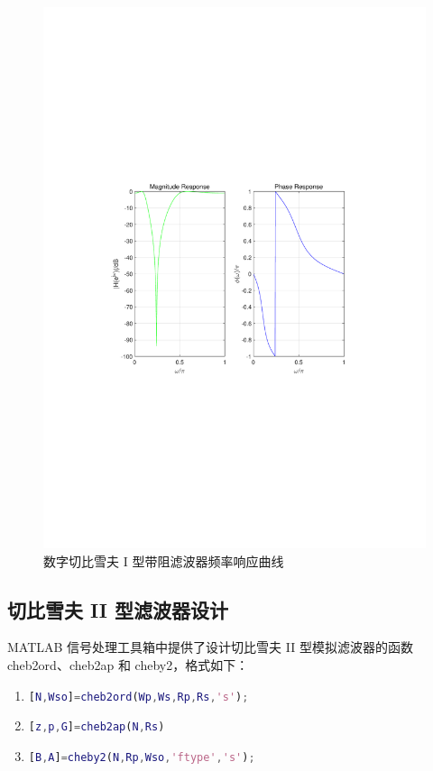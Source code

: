 \documentclass[12pt,AutoFakeBold]{article}
\begin{document}
\begin{figure}[hbtp]
	\centering
	\includegraphics[width=14cm]{figure/BSC1F.pdf}
	\caption{数字切比雪夫 I 型带阻滤波器频率响应曲线} \label{fig:BSC1F}
\end{figure}

\subsection{切比雪夫 II 型滤波器设计}

MATLAB 信号处理工具箱中提供了设计切比雪夫 II 型模拟滤波器的函数 cheb2ord、cheb2ap 和 cheby2，格式如下：

\begin{enumerate}[(1)]
\item \lstinline[language=Matlab]|[N,Wso]=cheb2ord(Wp,Ws,Rp,Rs,'s');|
\item \lstinline[language=Matlab]|[z,p,G]=cheb2ap(N,Rs)|
\item \lstinline[language=Matlab]|[B,A]=cheby2(N,Rp,Wso,'ftype','s');|
\end{enumerate}
\end{document}
